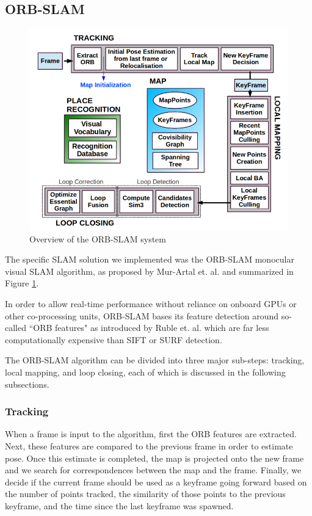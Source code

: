 \documentclass[twocolumn]{article}
\begin{document}
\subsection{ORB-SLAM}

\begin{figure}[H]
    \centering
    \includegraphics[width=\columnwidth]{figures/ORBSLAMoview.png}
    \caption{Overview of the ORB-SLAM system \cite{ORBSLAM}}
    \label{fig:OSLAMOview}
\end{figure}

The specific SLAM solution we implemented was the ORB-SLAM monocular visual SLAM algorithm, as proposed by Mur-Artal et. al. \cite{ORBSLAM} and summarized in Figure \ref{fig:OSLAMOview}.

In order to allow real-time performance without reliance on onboard GPUs or other co-processing units, ORB-SLAM bases its feature detection around so-called ``ORB features" as introduced by Ruble et. al. \cite{ORB} which are far less computationally expensive than SIFT or SURF detection.

The ORB-SLAM algorithm can be divided into three major sub-steps: tracking, local mapping, and loop closing, each of which is discussed in the following subsections.

\subsubsection{Tracking}

When a frame is input to the algorithm, first the ORB features are extracted. Next, these features are compared to the previous frame in order to estimate pose. Once this estimate is completed, the map is projected onto the new frame and we search for correspondences between the map and the frame. Finally, we decide if the current frame should be used as a keyframe going forward based on the number of points tracked, the similarity of those points to the previous keyframe, and the time since the last keyframe was spawned.
\end{document}
